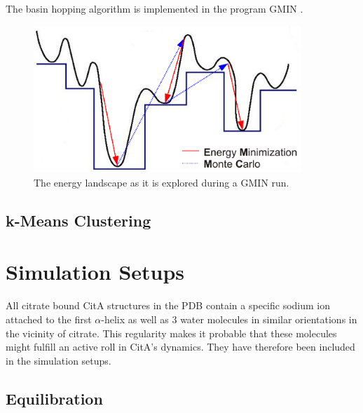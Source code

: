 \documentclass[english, a4paper, 12pt, titlepage, draft]{article}
\begin{document}
The basin hopping algorithm is implemented in the program GMIN \cite{GMIN}.

\begin{figure}
    \centering
    \includegraphics[width=0.9\textwidth]{figures/GMIN.pdf}
    \caption{The energy landscape as it is explored during a GMIN run.}
    \label{fig:GMIN}
\end{figure}        




\subsection{k-Means Clustering}



\section{Simulation Setups}

All citrate bound CitA structures in the PDB contain a specific sodium ion attached to the first $\alpha$-helix as well as 3 water molecules in similar orientations in the vicinity of citrate.
This regularity makes it probable that these molecules might fulfill an active roll in CitA's dynamics.
They have therefore been included in the simulation setups.

\subsection{Equilibration}
\end{document}
